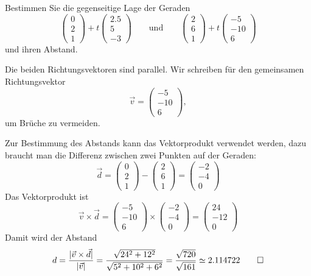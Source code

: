Bestimmen Sie die gegenseitige Lage der Geraden
\[
\begin{pmatrix}0\\2\\1\end{pmatrix}
+t
\begin{pmatrix}2.5\\5\\-3\end{pmatrix}
\qquad
\text{und}
\qquad
\begin{pmatrix}2\\6\\1\end{pmatrix}
+t
\begin{pmatrix}-5\\-10\\6\end{pmatrix}
\]
und ihren Abstand.


\begin{loesung}
Die beiden Richtungsvektoren sind parallel.
Wir schreiben für den gemeinsamen Richtungsvektor
\[
\vec v=
\begin{pmatrix}-5\\-10\\6\end{pmatrix},
\]
um Brüche zu vermeiden.

Zur Bestimmung des
Abstands kann das Vektorprodukt verwendet werden, dazu braucht man
die Differenz zwischen zwei Punkten auf der Geraden:
\[
\vec d=
\begin{pmatrix}0\\2\\1\end{pmatrix}
-\begin{pmatrix}2\\6\\1\end{pmatrix}
=
\begin{pmatrix}-2\\-4\\0\end{pmatrix}
\]
Das Vektorprodukt ist
\[
\vec v\times \vec d
=
\begin{pmatrix}-5\\-10\\6\end{pmatrix}
\times
\begin{pmatrix}-2\\-4\\0\end{pmatrix}
=
\begin{pmatrix}24\\-12\\0\end{pmatrix}
\]
Damit wird der Abstand
\begin{align*}
d
=
\frac{|\vec v\times \vec d|}{|\vec v|}
=\frac{\sqrt{24^2+12^2}}{\sqrt{5^2+10^2+6^2}}
=\frac{\sqrt{720}}{\sqrt{161}}
\simeq 2.114722
\qedhere
\end{align*}
\end{loesung}

